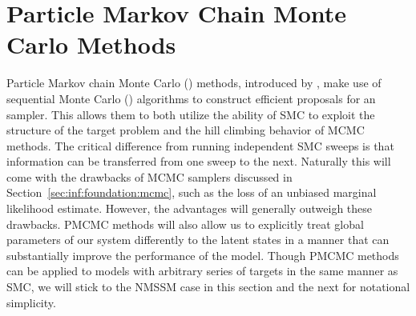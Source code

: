 
\section{Particle Markov Chain Monte Carlo Methods}
\label{sec:part:pmcmc}

Particle Markov chain Monte Carlo (\pmcmc) methods, introduced by \citet{andrieuDH2010}, make use of 
sequential Monte Carlo (\smc) algorithms \citep{gordon1993novel,doucet2001sequential} to construct 
efficient proposals for an \mcmc sampler. This allows them to both utilize the ability of SMC to
exploit the structure of the target problem and the hill climbing behavior of MCMC methods.
The critical difference from running independent SMC sweeps is that information can be transferred
from one sweep to the next. 
Naturally this will come with the drawbacks of MCMC samplers
discussed in Section~\ref{sec:inf:foundation:mcmc}, such as the loss of an unbiased marginal likelihood estimate.
However, the advantages will generally outweigh these drawbacks.  PMCMC methods will also allow us to explicitly
treat global parameters of our system differently to the latent states in a manner that can substantially improve
the performance of the model.
Though PMCMC methods can be applied to models with arbitrary series of targets in the same manner as SMC, we will stick
to the NMSSM case in this section and the next for notational simplicity.

